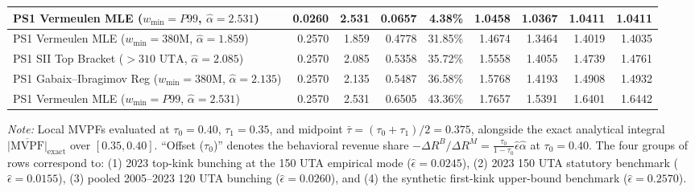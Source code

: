 \begin{table}[htbp]
\begin{adjustbox}{max width=\textwidth}
\begin{tabular}{lrrrrrrrr}
PS1 Vermeulen MLE ($w_{\min}=P99$, $\hat{\alpha}=2.531$) & 0.0260 & 2.531 & 0.0657 & 4.38\% & 1.0458 & 1.0367 & 1.0411 & 1.0411 \\
\midrule
PS1 Vermeulen MLE ($w_{\min}=380\text{M}$, $\hat{\alpha}=1.859$) & 0.2570 & 1.859 & 0.4778 & 31.85\% & 1.4674 & 1.3464 & 1.4019 & 1.4035 \\
PS1 SII Top Bracket ($>310\text{ UTA}$, $\hat{\alpha}=2.085$) & 0.2570 & 2.085 & 0.5358 & 35.72\% & 1.5558 & 1.4055 & 1.4739 & 1.4761 \\
PS1 Gabaix--Ibragimov Reg ($w_{\min}=380\text{M}$, $\hat{\alpha}=2.135$) & 0.2570 & 2.135 & 0.5487 & 36.58\% & 1.5768 & 1.4193 & 1.4908 & 1.4932 \\
PS1 Vermeulen MLE ($w_{\min}=P99$, $\hat{\alpha}=2.531$) & 0.2570 & 2.531 & 0.6505 & 43.36\% & 1.7657 & 1.5391 & 1.6401 & 1.6442 \\
\bottomrule
\end{tabular}
\end{adjustbox}
\begin{minipage}{\textwidth}
\vspace{4pt}
\footnotesize\textit{Note:} Local MVPFs evaluated at $\tau_0 = 0.40$, $\tau_1 = 0.35$, and midpoint $\bar{\tau} = (\tau_0+\tau_1)/2 = 0.375$, alongside the exact analytical integral $\overline{|\mathrm{MVPF}|}_{\mathrm{exact}}$ over $[0.35, 0.40]$. ``Offset ($\tau_0$)'' denotes the behavioral revenue share $-\Delta R^B / \Delta R^M = \frac{\tau_0}{1-\tau_0}\hat{\epsilon}\hat{\alpha}$ at $\tau_0 = 0.40$. The four groups of rows correspond to: (1) 2023 top-kink bunching at the 150 UTA empirical mode ($\hat{\epsilon}=0.0245$), (2) 2023 150 UTA statutory benchmark ($\hat{\epsilon}=0.0155$), (3) pooled 2005--2023 120 UTA bunching ($\hat{\epsilon}=0.0260$), and (4) the synthetic first-kink upper-bound benchmark ($\hat{\epsilon}=0.2570$).
\end{minipage}
\end{table}
